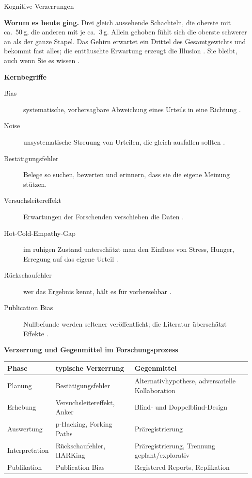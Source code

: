 \begin{handout}{Kognitive Verzerrungen}

\textbf{Worum es heute ging.} Drei gleich aussehende Schachteln, die
oberste mit ca.\ 50\,g, die anderen mit je ca.\ 3\,g. Allein gehoben
fühlt sich die oberste schwerer an als der ganze Stapel. Das Gehirn
erwartet ein Drittel des Gesamtgewichts und bekommt fast alles; die
enttäuschte Erwartung erzeugt die Illusion \parencite{charpentier1891}.
Sie bleibt, auch wenn Sie es wissen \parencite{flanagan2000independence}.

\textbf{Kernbegriffe}
\begin{description}
  \item[Bias] systematische, vorhersagbare Abweichung eines Urteils in
    eine Richtung \parencite{tversky1974judgment}.
  \item[Noise] unsystematische Streuung von Urteilen, die gleich ausfallen
    sollten \parencite{kahneman2021}.
  \item[Bestätigungsfehler] Belege so suchen, bewerten und erinnern, dass
    sie die eigene Meinung stützen.
  \item[Versuchsleitereffekt] Erwartungen der Forschenden verschieben die
    Daten \parencite{rosenthal1963experimenter}.
  \item[Hot-Cold-Empathy-Gap] im ruhigen Zustand unterschätzt man den
    Einfluss von Stress, Hunger, Erregung auf das eigene Urteil
    \parencite{loewenstein1996visceral}.
  \item[Rückschaufehler] wer das Ergebnis kennt, hält es für vorhersehbar
    \parencite{fischhoff1975hindsight}.
  \item[Publication Bias] Nullbefunde werden seltener veröffentlicht; die
    Literatur überschätzt Effekte \parencite{rosenthal1979filedrawer}.
\end{description}

\textbf{Verzerrung und Gegenmittel im Forschungsprozess}

\begin{center}
\small
\begin{tabular}{p{}p{}p{}}
\toprule
\textbf{Phase} & \textbf{typische Verzerrung} & \textbf{Gegenmittel} \\
\midrule
Planung & Bestätigungsfehler & Alternativhypothese, adversarielle Kollaboration \\
Erhebung & Versuchsleitereffekt, Anker & Blind- und Doppelblind-Design \\
Auswertung & p-Hacking, Forking Paths & Präregistrierung \\
Interpretation & Rückschaufehler, HARKing & Präregistrierung, Trennung geplant/explorativ \\
Publikation & Publication Bias & Registered Reports, Replikation \\
\bottomrule
\end{tabular}
\end{center}


\end{handout}
